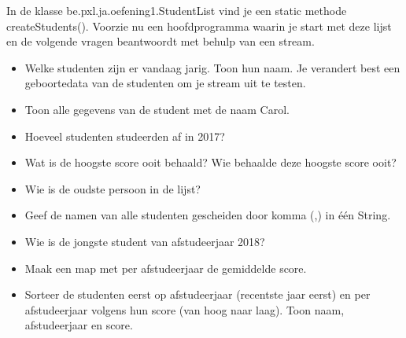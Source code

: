\begin{oefening}

In de klasse be.pxl.ja.oefening1.StudentList vind je een static methode createStudents(). Voorzie nu een hoofdprogramma waarin je start met deze lijst en de volgende vragen beantwoordt met behulp van een stream.

\begin{itemize}
\item Welke studenten zijn er vandaag jarig. Toon hun naam. Je verandert best een geboortedata van de studenten om je stream uit te testen.
\item Toon alle gegevens van de student met de naam Carol.
\item Hoeveel studenten studeerden af in 2017?
\item Wat is de hoogste score ooit behaald? Wie behaalde deze hoogste score ooit?
\item Wie is de oudste persoon in de lijst?
\item Geef de namen van alle studenten gescheiden door komma (,) in  \'e\'en String.
\item Wie is de jongste student van afstudeerjaar 2018?
\item Maak een map met per afstudeerjaar de gemiddelde score.
\item Sorteer de studenten eerst op afstudeerjaar (recentste jaar eerst) en per afstudeerjaar volgens hun score (van hoog naar laag). Toon naam, afstudeerjaar en score.
\end{itemize}
\end{oefening}
